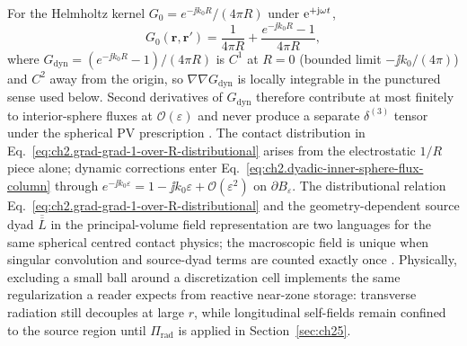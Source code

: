 For the Helmholtz kernel $G_0=e^{-\jj k_0 R}/(4\pi R)$ under $\mathrm{e}^{+\mathrm{j}\omega t}$,
\begin{equation}
\label{eq:ch2.helmholtz-static-dynamic-split}
G_0(\mathbf{r},\mathbf{r}')
=
\frac{1}{4\pi R}
+\frac{e^{-\jj k_0 R}-1}{4\pi R},
\end{equation}
where $G_{\mathrm{dyn}}=(e^{-\jj k_0 R}-1)/(4\pi R)$ is $C^{1}$ at $R=0$ (bounded limit $-\jj k_0/(4\pi)$) and $C^{2}$ away from the origin, so $\nabla\nabla G_{\mathrm{dyn}}$ is locally integrable in the punctured sense used below.
Second derivatives of $G_{\mathrm{dyn}}$ therefore contribute at most finitely to interior-sphere fluxes at $\mathcal{O}(\varepsilon)$ and never produce a separate $\delta^{(3)}$ tensor under the spherical PV prescription \cite{yaghjian1978,tai1994}.
The contact distribution in Eq.~\eqref{eq:ch2.grad-grad-1-over-R-distributional} arises from the electrostatic $1/R$ piece alone;
dynamic corrections enter Eq.~\eqref{eq:ch2.dyadic-inner-sphere-flux-column} through $e^{-\jj k_0\varepsilon}=1-\jj k_0\varepsilon+\mathcal{O}(\varepsilon^{2})$ on $\partial B_\varepsilon$.
The distributional relation Eq.~\eqref{eq:ch2.grad-grad-1-over-R-distributional} and the geometry-dependent source dyad $\overline{\overline L}$ in the principal-volume field representation are two languages for the same spherical centred contact physics; the macroscopic field is unique when singular convolution and source-dyad terms are counted exactly once \cite{yaghjian1978,yaghjian1980source}.
Physically, excluding a small ball around a discretization cell implements the same regularization a reader expects from reactive near-zone storage: transverse radiation still decouples at large $r$, while longitudinal self-fields remain confined to the source region until $\Pi_{\mathrm{rad}}$ is applied in Section~\ref{sec:ch25}.
